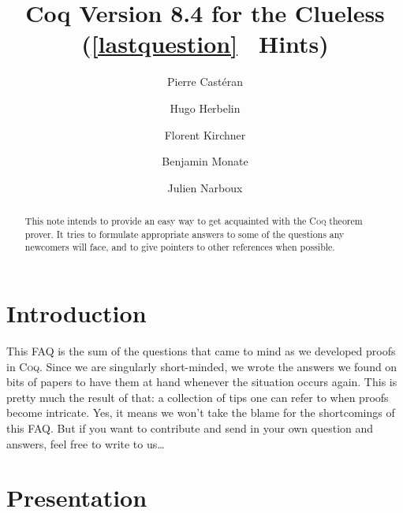 \documentclass[a4paper,pdftex]{article}
\def\Coq{\textsc{Coq}}
\begin{document}

\renewcommand{\thesubsubsection}{\arabic{question}}


\title{Coq Version 8.4 for the Clueless\\
  \large(\protect\ref{lastquestion}
  \ Hints)
}
\author{Pierre Castéran \and Hugo Herbelin \and Florent Kirchner \and Benjamin Monate \and Julien Narboux}
\maketitle


\begin{abstract}
This note intends to provide an easy way to get acquainted with the
{\Coq} theorem prover. It tries to formulate appropriate answers
to some of the questions any newcomers will face, and to give
pointers to other references when possible.
\end{abstract}


\tableofcontents


\newpage

\section{Introduction}
This FAQ is the sum of the questions that came to mind as we developed
proofs in \Coq. Since we are singularly short-minded, we wrote the
answers we found on bits of papers to have them at hand whenever the
situation occurs again. This is pretty much the result of that: a
collection of tips one can refer to when proofs become intricate. Yes,
it means we won't take the blame for the shortcomings of this
FAQ. But if you want to contribute and send in your own question and
answers, feel free to write to us\ldots


\section{Presentation}
\end{document}
